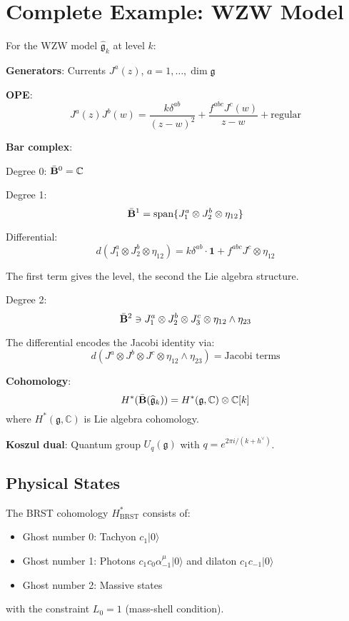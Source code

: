 \section{Complete Example: WZW Model}

\begin{example}
For the WZW model $\widehat{\mathfrak{g}}_k$ at level $k$:

\textbf{Generators}: Currents $J^a(z)$, $a = 1, \ldots, \dim \mathfrak{g}$

\textbf{OPE}: 
$$J^a(z)J^b(w) = \frac{k\delta^{ab}}{(z-w)^2} + \frac{f^{abc}J^c(w)}{z-w} + \text{regular}$$

\textbf{Bar complex}:

Degree 0: $\bar{\mathbf{B}}^0 = \mathbb{C}$

Degree 1: 
$$\bar{\mathbf{B}}^1 = \text{span}\{J^a_1 \otimes J^b_2 \otimes \eta_{12}\}$$

Differential:
$$d(J^a_1 \otimes J^b_2 \otimes \eta_{12}) = k\delta^{ab} \cdot \mathbf{1} + f^{abc}J^c \otimes \eta_{12}$$

The first term gives the level, the second the Lie algebra structure.

Degree 2:
$$\bar{\mathbf{B}}^2 \ni J^a_1 \otimes J^b_2 \otimes J^c_3 \otimes \eta_{12} \wedge \eta_{23}$$

The differential encodes the Jacobi identity via:
$$d(J^a \otimes J^b \otimes J^c \otimes \eta_{12} \wedge \eta_{23}) = \text{Jacobi terms}$$

\textbf{Cohomology}:
$$H^*(\bar{\mathbf{B}}(\widehat{\mathfrak{g}}_k)) = H^*(\mathfrak{g}, \mathbb{C}) \otimes \mathbb{C}[k]$$
where $H^*(\mathfrak{g}, \mathbb{C})$ is Lie algebra cohomology.

\textbf{Koszul dual}: Quantum group $U_q(\mathfrak{g})$ with $q = e^{2\pi i/(k+h^\vee)}$.
\end{example}


\subsection{Physical States}
 
\begin{theorem}
The BRST cohomology $H^*_{\text{BRST}}$ consists of:
\begin{itemize}
\item Ghost number 0: Tachyon $c_1|0\rangle$
\item Ghost number 1: Photons $c_1c_0\alpha^\mu_{-1}|0\rangle$ and dilaton $c_1c_{-1}|0\rangle$
\item Ghost number 2: Massive states
\end{itemize}
with the constraint $L_0 = 1$ (mass-shell condition).
\end{theorem}
 
